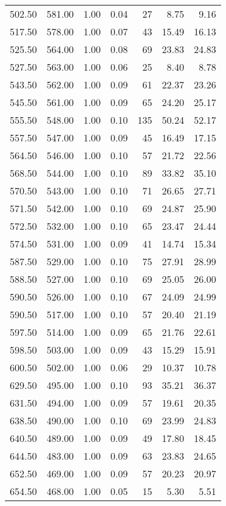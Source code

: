 \begin{table}
\begin{tabular}{rrrrrrr}
502.50 & 581.00 & 1.00 & 0.04 & 27 & 8.75 & 9.16 \\
517.50 & 578.00 & 1.00 & 0.07 & 43 & 15.49 & 16.13 \\
525.50 & 564.00 & 1.00 & 0.08 & 69 & 23.83 & 24.83 \\
527.50 & 563.00 & 1.00 & 0.06 & 25 & 8.40 & 8.78 \\
543.50 & 562.00 & 1.00 & 0.09 & 61 & 22.37 & 23.26 \\
545.50 & 561.00 & 1.00 & 0.09 & 65 & 24.20 & 25.17 \\
555.50 & 548.00 & 1.00 & 0.10 & 135 & 50.24 & 52.17 \\
557.50 & 547.00 & 1.00 & 0.09 & 45 & 16.49 & 17.15 \\
564.50 & 546.00 & 1.00 & 0.10 & 57 & 21.72 & 22.56 \\
568.50 & 544.00 & 1.00 & 0.10 & 89 & 33.82 & 35.10 \\
570.50 & 543.00 & 1.00 & 0.10 & 71 & 26.65 & 27.71 \\
571.50 & 542.00 & 1.00 & 0.10 & 69 & 24.87 & 25.90 \\
572.50 & 532.00 & 1.00 & 0.10 & 65 & 23.47 & 24.44 \\
574.50 & 531.00 & 1.00 & 0.09 & 41 & 14.74 & 15.34 \\
587.50 & 529.00 & 1.00 & 0.10 & 75 & 27.91 & 28.99 \\
588.50 & 527.00 & 1.00 & 0.10 & 69 & 25.05 & 26.00 \\
590.50 & 526.00 & 1.00 & 0.10 & 67 & 24.09 & 24.99 \\
590.50 & 517.00 & 1.00 & 0.10 & 57 & 20.40 & 21.19 \\
597.50 & 514.00 & 1.00 & 0.09 & 65 & 21.76 & 22.61 \\
598.50 & 503.00 & 1.00 & 0.09 & 43 & 15.29 & 15.91 \\
600.50 & 502.00 & 1.00 & 0.06 & 29 & 10.37 & 10.78 \\
629.50 & 495.00 & 1.00 & 0.10 & 93 & 35.21 & 36.37 \\
631.50 & 494.00 & 1.00 & 0.09 & 57 & 19.61 & 20.35 \\
638.50 & 490.00 & 1.00 & 0.10 & 69 & 23.99 & 24.83 \\
640.50 & 489.00 & 1.00 & 0.09 & 49 & 17.80 & 18.45 \\
644.50 & 483.00 & 1.00 & 0.09 & 63 & 23.83 & 24.65 \\
652.50 & 469.00 & 1.00 & 0.09 & 57 & 20.23 & 20.97 \\
654.50 & 468.00 & 1.00 & 0.05 & 15 & 5.30 & 5.51 \\

\end{tabular}
\end{table}
